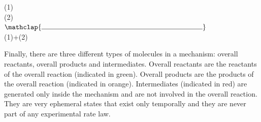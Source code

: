 \documentclass[main.tex]{subfiles}
\begin{document}
\begin{description}
\begin{center}(1)\hfill{} \\
(2)\hfill{} 
\\$\mathclap{\rule{8cm}{0.4pt}}$\\
(1)+(2)\hfill{} 
\end{center}
Finally, there are three different types of molecules in a mechanism: overall reactants, overall products and intermediates. Overall reactants are the reactants of the overall reaction (indicated in green). Overall products are the products of the overall reaction (indicated in orange). Intermediates (indicated in red) are generated only inside the mechanism and are not involved in the overall reaction. They are very ephemeral states that exist only temporally and they are never part of any experimental rate law.


\end{description}
\end{document}

